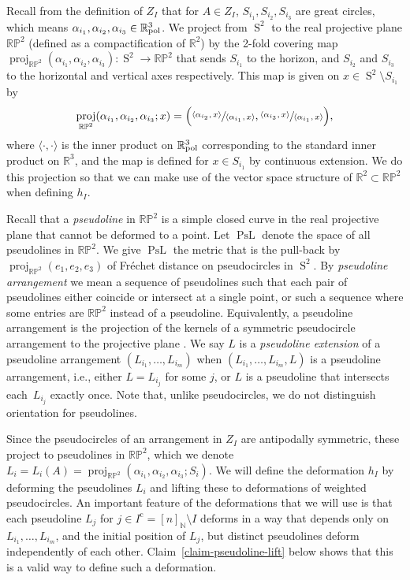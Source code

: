 \documentclass[11pt]{article}
\newcommand{\ie}{i.e.,\xspace}
\numberwithin{equation}{section}
\theoremstyle{remark}
\let\mb\mathbb
\let\df\emph
\newcommand{\compl}[1]{{{#1}^{\text{c}}}}
\DeclareMathOperator{\sphere}{S}
\newcommand{\Rpol}[1]{\mb{R}\mathrlap{{}^{#1}}{}_\text{pol}}
\DeclareMathOperator{\proj}{proj}
\DeclareMathOperator{\curves}{PsL}
\newcommand{\projplane}{\mb{RP}^2}
\begin{document}
Recall from the definition of $Z_I$ that for $A \in Z_I$, $S_{i_1},S_{i_2},S_{i_3}$ are great circles, which means $\alpha_{i_1}, \alpha_{i_2},\alpha_{i_3} \in \Rpol{3}$.
We project from $\sphere^2$ to the real projective plane $\projplane$ (defined as a compactification of $\mb{R}^2$) by the 2-fold covering map $\proj_{\projplane}(\alpha_{i_1},\alpha_{i_2},\alpha_{i_3}) : \sphere^2 \to \projplane$ that sends $S_{i_1}$ to the horizon, and $S_{i_2}$ and $S_{i_3}$ to the horizontal and vertical axes respectively.
This map is given on $x \in \sphere^2 \setminus S_{i_1}$ by
\[ \proj_{\projplane}(\alpha_{i_1},\alpha_{i_2},\alpha_{i_3}; x) = \Bigl( \frac{\langle \alpha_{i_2}, x \rangle}{\langle \alpha_{i_1}, x \rangle}, \frac{\langle \alpha_{i_3}, x \rangle}{\langle \alpha_{i_1}, x \rangle} \Bigr), \]
where $\langle \cdot,\cdot \rangle$ is the inner product on $\Rpol{3}$ corresponding to the standard inner product on $\mb{R}^3$,
and the map is defined for $x \in S_{i_1}$ by continuous extension.
We do this projection so that we can make use of the vector space structure of $\mb{R}^2 \subset \projplane$ when defining $h_I$.

Recall that a \df{pseudoline} in $\projplane$ is a simple closed curve in the real projective plane that cannot be deformed to a point.
Let $\curves$ denote the space of all pseudolines in $\projplane$.
We give $\curves$ the metric that is the pull-back by $\proj_{\projplane}(e_1,e_2,e_3)$ of Fréchet distance on pseudocircles in $\sphere^2$.
By \df{pseudoline arrangement} we mean a sequence of pseudolines such that each pair of pseudolines either coincide or intersect at a single point, or such a sequence where some entries are $\projplane$ instead of a pseudoline.
Equivalently, a pseudoline arrangement is the projection of the kernels of a symmetric pseudocircle arrangement to the projective plane \cite[\S 6.2]{bjorner1999oriented}.
We say $L$ is a \df{pseudoline extension} of a pseudoline arrangement $(L_{i_1},\dots,L_{i_m})$ when $(L_{i_1},\dots,L_{i_m},L)$ is a pseudoline arrangement, \ie either $L = L_{i_j}$ for some $j$, or $L$ is a pseudoline that intersects each~$L_{i_j}$ exactly once.
Note that, unlike pseudocircles, we do not distinguish orientation for pseudolines.

Since the pseudocircles of an arrangement in $Z_I$ are antipodally symmetric, these project to pseudolines in $\projplane$, which we denote $L_i = L_i(A) = \proj_{\projplane}(\alpha_{i_1},\alpha_{i_2},\alpha_{i_3};S_i)$.
We will define the deformation $h_I$ by deforming the pseudolines $L_i$ and lifting these to deformations of weighted pseudocircles.
An important feature of the deformations that we will use is that each pseudoline $L_j$ for $j \in \compl{I} = [n]_\mb{N} \setminus I$ deforms in a way that depends only on $L_{i_1},\dots,L_{i_m}$, and the initial position of $L_{j}$, but distinct pseudolines deform independently of each other.
Claim~\ref{claim-pseudoline-lift} below shows that this is a valid way to define such a deformation.
\end{document}
